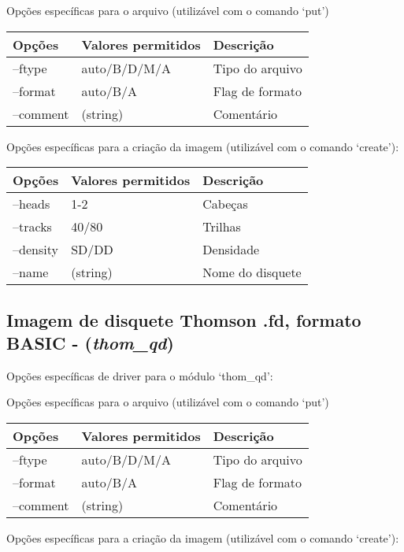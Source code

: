 \documentclass[letterpaper,10pt,brazil]{sphinxmanual}
\begin{document}
Opções específicas para o arquivo (utilizável com o comando `put')

\noindent\begin{tabulary}{\linewidth}{|L|L|L|}
\hline

Opções
&
Valores permitidos
&
Descrição
\\
\hline
--ftype
&
auto/B/D/M/A
&
Tipo do arquivo
\\
\hline
--format
&
auto/B/A
&
Flag de formato
\\
\hline
--comment
&
(string)
&
Comentário
\\
\hline\end{tabulary}


Opções específicas para a criação da imagem (utilizável com o comando `create'):

\noindent\begin{tabulary}{\linewidth}{|L|L|L|}
\hline

Opções
&
Valores permitidos
&
Descrição
\\
\hline
--heads
&
1-2
&
Cabeças
\\
\hline
--tracks
&
40/80
&
Trilhas
\\
\hline
--density
&
SD/DD
&
Densidade
\\
\hline
--name
&
(string)
&
Nome do disquete
\\
\hline\end{tabulary}



\subsection{Imagem de disquete Thomson .fd, formato BASIC - (\emph{thom\_qd})}
\label{tools/imgtool:imagem-de-disquete-thomson-fd-formato-basic-thom-qd}
Opções específicas de driver para o módulo `thom\_qd':

Opções específicas para o arquivo (utilizável com o comando `put')

\noindent\begin{tabulary}{\linewidth}{|L|L|L|}
\hline

Opções
&
Valores permitidos
&
Descrição
\\
\hline
--ftype
&
auto/B/D/M/A
&
Tipo do arquivo
\\
\hline
--format
&
auto/B/A
&
Flag de formato
\\
\hline
--comment
&
(string)
&
Comentário
\\
\hline\end{tabulary}


Opções específicas para a criação da imagem (utilizável com o comando `create'):
\end{document}
